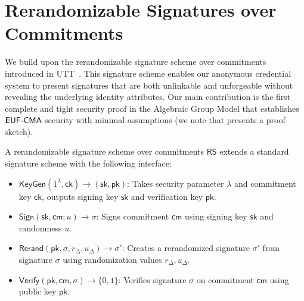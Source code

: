% 
% 
\newpage
\section{Rerandomizable Signatures over Commitments}\label{sec:rerandsig_g1}
We build upon the rerandomizable signature scheme over commitments introduced in UTT~\cite{tomescu2022utt}. This signature scheme enables our anonymous credential system to present signatures that are both unlinkable and unforgeable without revealing the underlying identity attributes. Our main contribution is the first complete and tight security proof in the Algebraic Group Model that establishes $\mathsf{EUF\text{-}CMA}$ security with minimal assumptions (we note that \cite{tomescu2022utt} presents a proof sketch).


\begin{definition}
A rerandomizable signature scheme over commitments $\mathsf{RS}$ extends a standard signature scheme with the following interface:
\begin{itemize}
    \item $\mathsf{KeyGen}(1^\lambda, \mathsf{ck}) \rightarrow (\mathsf{sk}, \mathsf{pk})$: Takes security parameter $\lambda$ and commitment key $\mathsf{ck}$, outputs signing key $\mathsf{sk}$ and verification key $\mathsf{pk}$.
    
    \item $\mathsf{Sign}(\mathsf{sk}, \mathsf{cm}; u) \rightarrow \sigma$: Signs commitment $\mathsf{cm}$ using signing key $\mathsf{sk}$ and randomness $u$.
    
    \item $\mathsf{Rerand}(\mathsf{pk}, \sigma, r_\Delta, u_\Delta) \rightarrow \sigma'$: Creates a rerandomized signature $\sigma'$ from signature $\sigma$ using randomization values $r_\Delta, u_\Delta$.
    
    \item $\mathsf{Verify}(\mathsf{pk}, \mathsf{cm}, \sigma) \rightarrow \{0,1\}$: Verifies signature $\sigma$ on commitment $\mathsf{cm}$ using public key $\mathsf{pk}$.
\end{itemize}
\end{definition}

